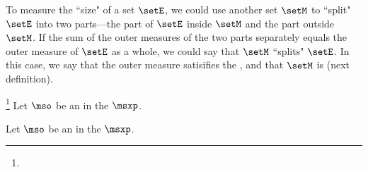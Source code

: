 {To measure the ``size" of a set $\setE$, we could use another set $\setM$ to ``split" $\setE$ into 
two parts---the part of $\setE$ inside $\setM$ and the part outside $\setM$.
If the sum of the outer measures of the two parts separately equals the outer measure of $\setE$
as a whole, we could say that $\setM$ ``splits" $\setE$.
In this case, we say that the outer measure satisifies the ,
and that $\setM$ is  (next definition).
\begin{definition}
\label{def:mso_m}
\footnote{
  }
Let $\mso$ be an  in the  $\msxp$.
\end{definition}


\begin{definition}
\label{def:null_set}
Let $\mso$ be an  in the  $\msxp$.
\end{definition}

}

